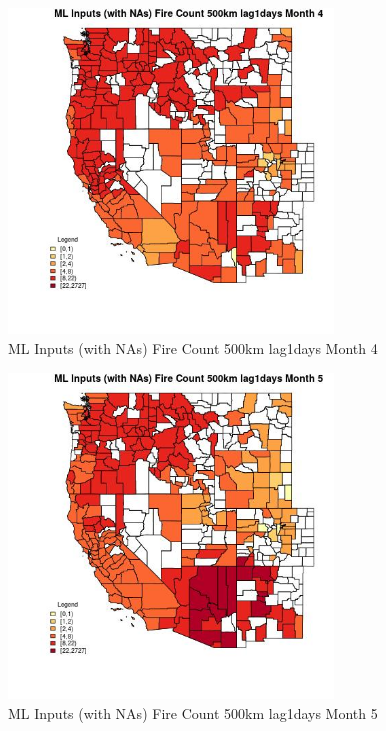 \begin{figure} 
\centering  
\includegraphics[width=0.77\textwidth]{Code_Outputs/Report_ML_input_PM25_Step4_part_f_de_duplicated_aves_prioritize_24hr_obswNAs_CountyFire_Count_500km_lag1daysmedianMonth4.jpg} 
\caption{\label{fig:Report_ML_input_PM25_Step4_part_f_de_duplicated_aves_prioritize_24hr_obswNAsCountyFire_Count_500km_lag1daysmedianMonth4}ML Inputs (with NAs) Fire Count 500km lag1days Month 4} 
\end{figure} 
 

\begin{figure} 
\centering  
\includegraphics[width=0.77\textwidth]{Code_Outputs/Report_ML_input_PM25_Step4_part_f_de_duplicated_aves_prioritize_24hr_obswNAs_CountyFire_Count_500km_lag1daysmedianMonth5.jpg} 
\caption{\label{fig:Report_ML_input_PM25_Step4_part_f_de_duplicated_aves_prioritize_24hr_obswNAsCountyFire_Count_500km_lag1daysmedianMonth5}ML Inputs (with NAs) Fire Count 500km lag1days Month 5} 
\end{figure} 
 

